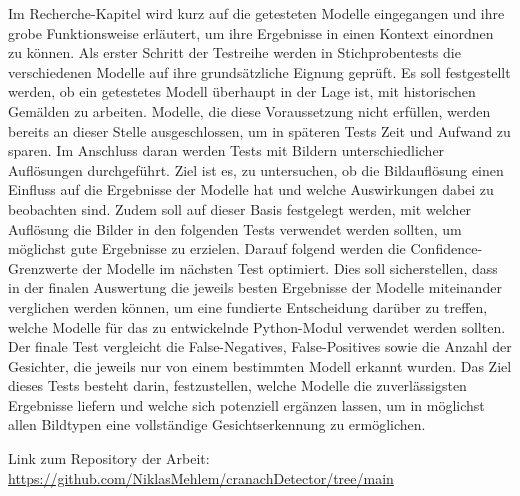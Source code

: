 Im Recherche-Kapitel wird kurz auf die getesteten Modelle eingegangen und ihre grobe Funktionsweise erläutert, um ihre Ergebnisse in einen Kontext einordnen zu können.
Als erster Schritt der Testreihe werden in Stichprobentests die verschiedenen Modelle auf ihre grundsätzliche Eignung geprüft. Es soll festgestellt werden, ob ein getestetes Modell überhaupt in der Lage ist, mit historischen Gemälden zu arbeiten. Modelle, die diese Voraussetzung nicht erfüllen, werden bereits an dieser Stelle ausgeschlossen, um in späteren Tests Zeit und Aufwand zu sparen.
Im Anschluss daran werden Tests mit Bildern unterschiedlicher Auflösungen durchgeführt. Ziel ist es, zu untersuchen, ob die Bildauflösung einen Einfluss auf die Ergebnisse der Modelle hat und welche Auswirkungen dabei zu beobachten sind. Zudem soll auf dieser Basis festgelegt werden, mit welcher Auflösung die Bilder in den folgenden Tests verwendet werden sollten, um möglichst gute Ergebnisse zu erzielen.
Darauf folgend werden die Confidence-Grenzwerte der Modelle im nächsten Test optimiert. Dies soll sicherstellen, dass in der finalen Auswertung die jeweils besten Ergebnisse der Modelle miteinander verglichen werden können, um eine fundierte Entscheidung darüber zu treffen, welche Modelle für das zu entwickelnde Python-Modul verwendet werden sollten.
Der finale Test vergleicht die False-Negatives, False-Positives sowie die Anzahl der Gesichter, die jeweils nur von einem bestimmten Modell erkannt wurden. Das Ziel dieses Tests besteht darin, festzustellen, welche Modelle die zuverlässigsten Ergebnisse liefern und welche sich potenziell ergänzen lassen, um in möglichst allen Bildtypen eine vollständige Gesichtserkennung zu ermöglichen.

Link zum Repository der Arbeit: \url{https://github.com/NiklasMehlem/cranachDetector/tree/main}
